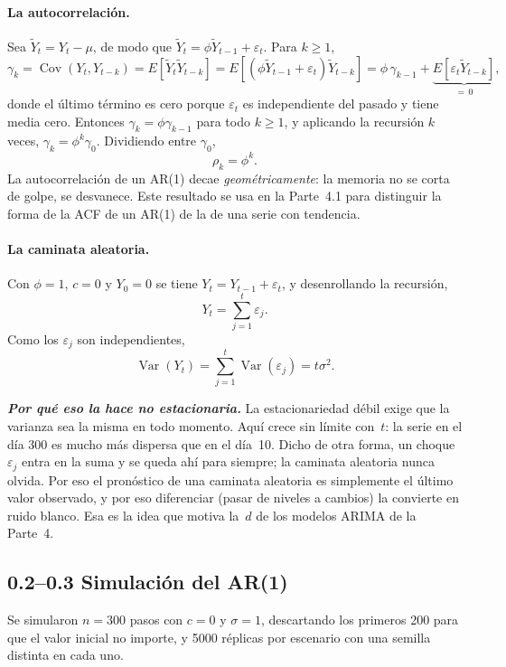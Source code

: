 \documentclass[11pt]{article}
\begin{document}
\paragraph{La autocorrelaci\'on.} Sea $\tilde Y_t = Y_t - \mu$, de modo que
$\tilde Y_t = \phi \tilde Y_{t-1} + \varepsilon_t$. Para $k \ge 1$,
\[
\gamma_k = \operatorname{Cov}(Y_t, Y_{t-k}) = E[\tilde Y_t \tilde Y_{t-k}]
 = E[(\phi \tilde Y_{t-1} + \varepsilon_t)\tilde Y_{t-k}]
 = \phi\, \gamma_{k-1} + \underbrace{E[\varepsilon_t \tilde Y_{t-k}]}_{=\,0},
\]
donde el \'ultimo t\'ermino es cero porque $\varepsilon_t$ es independiente
del pasado y tiene media cero. Entonces $\gamma_k = \phi\gamma_{k-1}$ para
todo $k\ge1$, y aplicando la recursi\'on $k$ veces, $\gamma_k = \phi^k
\gamma_0$. Dividiendo entre $\gamma_0$,
\[
\boxed{\;\rho_k = \phi^k.\;}
\]
La autocorrelaci\'on de un AR(1) decae \emph{geom\'etricamente}: la memoria
no se corta de golpe, se desvanece. Este resultado se usa en la Parte~4.1
para distinguir la forma de la ACF de un AR(1) de la de una serie con
tendencia.

\paragraph{La caminata aleatoria.} Con $\phi = 1$, $c = 0$ y $Y_0 = 0$ se
tiene $Y_t = Y_{t-1} + \varepsilon_t$, y desenrollando la recursi\'on,
\[
Y_t = \sum_{j=1}^{t} \varepsilon_j .
\]
Como los $\varepsilon_j$ son independientes,
\[
\boxed{\;\operatorname{Var}(Y_t) = \sum_{j=1}^{t} \operatorname{Var}(\varepsilon_j)
= t\sigma^2 .\;}
\]

\emph{\textbf{Por qu\'e eso la hace no estacionaria.}} La estacionariedad
d\'ebil exige que la varianza sea la misma en todo momento. Aqu\'i crece sin
l\'imite con~$t$: la serie en el d\'ia \num{300} es mucho m\'as dispersa que
en el d\'ia~\num{10}. Dicho de otra forma, un choque $\varepsilon_j$ entra
en la suma y se queda ah\'i para siempre; la caminata aleatoria nunca
olvida. Por eso el pron\'ostico de una caminata aleatoria es simplemente el
\'ultimo valor observado, y por eso diferenciar (pasar de niveles a cambios)
la convierte en ruido blanco. Esa es la idea que motiva la~$d$ de los
modelos ARIMA de la Parte~4.

\subsection{0.2--0.3 Simulaci\'on del AR(1)}

Se simularon $n=\num{300}$ pasos con $c=0$ y $\sigma=1$, descartando los
primeros \num{200} para que el valor inicial no importe, y
\num{5000} r\'eplicas por escenario con una semilla distinta en cada uno.
\end{document}
